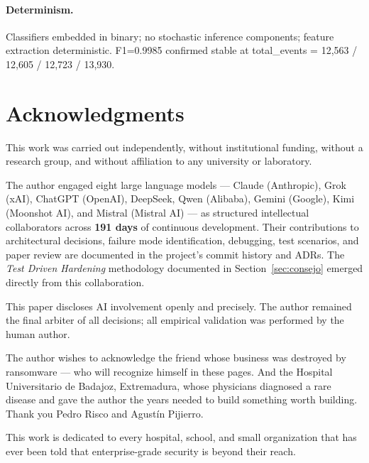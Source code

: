 \documentclass[11pt,a4paper]{article}
\begin{document}
    \paragraph{Determinism.}
    Classifiers embedded in binary; no stochastic inference components; feature extraction
    deterministic. F1=0.9985 confirmed stable at total\_events = 12,563 / 12,605 / 12,723 /
    13,930.

    \section*{Acknowledgments}
    \label{sec:acknowledgments}

    This work was carried out independently, without institutional funding, without a research
    group, and without affiliation to any university or laboratory.

    The author engaged eight large language models --- Claude (Anthropic), Grok (xAI), ChatGPT
    (OpenAI), DeepSeek, Qwen (Alibaba), Gemini (Google), Kimi (Moonshot AI), and Mistral
    (Mistral AI) --- as structured intellectual collaborators across \textbf{191 days} of
    continuous development. Their contributions to architectural decisions, failure mode
    identification, debugging, test scenarios, and paper review are documented in the project's
    commit history and ADRs. The \emph{Test Driven Hardening} methodology documented in
    Section~\ref{sec:consejo} emerged directly from this collaboration.

    This paper discloses AI involvement openly and precisely. The author remained the final
    arbiter of all decisions; all empirical validation was performed by the human author.

    The author wishes to acknowledge the friend whose business was destroyed by ransomware ---
    who will recognize himself in these pages. And the Hospital Universitario de Badajoz,
    Extremadura, whose physicians diagnosed a rare disease and gave the author the years needed
    to build something worth building. Thank you Pedro Risco and Agust\'in Pijierro.

    \medskip
    \noindent This work is dedicated to every hospital, school, and small organization that has
    ever been told that enterprise-grade security is beyond their reach.


    
    
\end{document}
